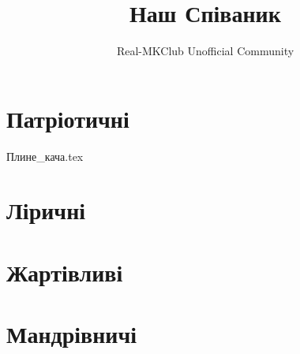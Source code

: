 \documentclass[a5paper,pagesize,10pt]{scrbook}
\title{Наш Співаник}
\author{Real-MKClub Unofficial Community}
\begin{document}
\maketitle
\chapter{Патріотичні}

{Плине_кача.tex}







\chapter{Ліричні}

\chapter{Жартівливі}



\chapter{Мандрівничі}


\tableofcontents
\end{document}
